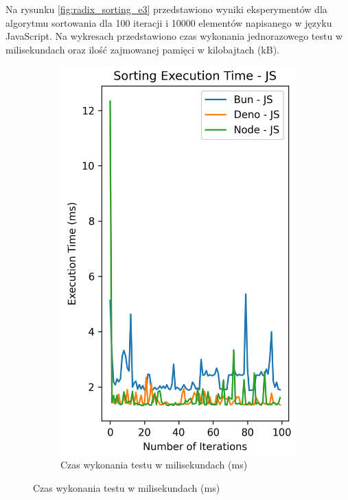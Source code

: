 Na rysunku \ref{fig:radix_sorting_e3} przedstawiono wyniki eksperymentów dla algorytmu sortowania dla 100 iteracji i 10000 elementów napisanego w języku JavaScript. Na wykresach przedstawiono czas wykonania jednorazowego testu w milisekundach oraz ilość zajmowanej pamięci w kilobajtach (kB).

\begin{figure}[H]
  \centering
  \begin{subfigure}[b]{0.44\textwidth}
    \centering
    \includegraphics[width=\textwidth]{Figures/sorting/sorting_radix_100_10000_js_time.png}
    \caption{Czas wykonania testu w milisekundach (ms)}
    \label{fig:radix_sorting_e3_time}

\end{subfigure}
\end{figure}
